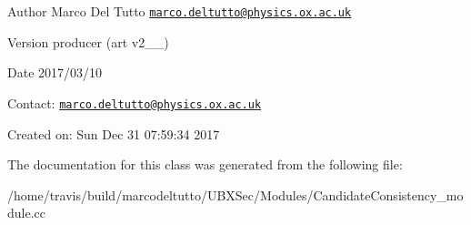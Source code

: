 \begin{DoxyAuthor}{Author}
Marco Del Tutto \href{mailto:marco.deltutto@physics.ox.ac.uk}{\tt marco.\-deltutto@physics.\-ox.\-ac.\-uk}
\end{DoxyAuthor}
\begin{DoxyVersion}{Version}
producer (art v2\-\_\-\_)
\end{DoxyVersion}
\begin{DoxyDate}{Date}
2017/03/10
\end{DoxyDate}
Contact\-: \href{mailto:marco.deltutto@physics.ox.ac.uk}{\tt marco.\-deltutto@physics.\-ox.\-ac.\-uk}

Created on\-: Sun Dec 31 07\-:59\-:34 2017 

The documentation for this class was generated from the following file\-:\begin{DoxyCompactItemize}
\item 
/home/travis/build/marcodeltutto/\-U\-B\-X\-Sec/\-Modules/Candidate\-Consistency\-\_\-module.\-cc\end{DoxyCompactItemize}
